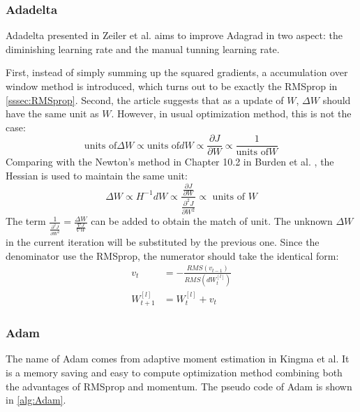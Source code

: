 \subsubsection{Adadelta}
Adadelta presented in Zeiler et al. \parencite{zeiler2012adadelta} aims to improve
Adagrad in two aspect: the diminishing learning rate and the manual tunning 
learning rate.
\par First, instead of simply summing up the squared gradients, a accumulation
over window method is introduced, which turns out to be exactly the RMSprop
in \autoref{sssec:RMSprop}. Second, the article suggests that as a 
update of $ W $, $ \Delta W $ should have the same unit as $ W $. However, in usual
optimization method, this is not the case:
\begin{equation}
    \text{units of}\Delta W \propto \text{units of} dW \propto \frac{\partial J}{\partial W} \propto \frac{1}{\text{units of}W}
\end{equation}  
Comparing with the Newton's method in Chapter 10.2 in Burden et al. 
\parencite{burden2010numerical}, the Hessian is used to maintain the same unit:
\begin{equation}
    \Delta W \propto H^{-1} dW \propto \frac{\frac{\partial J}{\partial W}}{\frac{\partial^{2} J}{\partial W^{2}}} \propto \text { units of } W
\end{equation}
The term $ \frac{1}{\frac{\partial^{2} J}{\partial W^{2}}} = \frac{\Delta W}{\frac{\nabla J}{\nabla W}} $
can be added to obtain the match of unit. The unknown $ \Delta W $ in the current iteration
will be substituted by the previous one. Since the denominator use the RMSprop,
the numerator should take the identical form:
\begin{equation}
    \begin{split}
        v_t & = -\frac{RMS(v_{t-1})}{RMS(dW_t^{[l]})} \\
        W_{t+1}^{[l]} & = W_{t}^{[l]} + v_t 
    \end{split}
\end{equation}

\subsubsection{Adam}
\label{sssec:Adam}
The name of Adam comes from adaptive moment estimation in Kingma et al. \parencite{kingma2014adam}
It is a memory saving and easy to compute optimization method combining 
both the advantages of RMSprop and momentum. The pseudo code of Adam is 
shown in \autoref{alg:Adam}.

